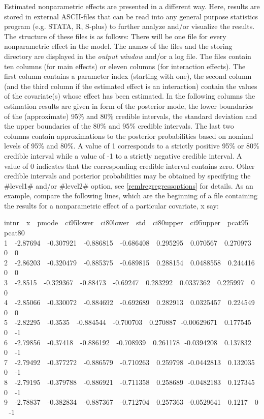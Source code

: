 Estimated nonparametric effects are presented in a different way.
Here, results are stored in external ASCII-files that can be read
into any general purpose statistics program (e.g. STATA, R, S-plus)
to further analyze and/or visualize the results. The structure of
these files is as follows: There will be one file for every
nonparametric effect in the model. The names of the files and the
storing directory are displayed in the {\em output window} and/or a
log file. The files contain ten columns (for main effects) or eleven
columns (for interaction effects). The first column contains a
parameter index (starting with one), the second column (and the
third column if the estimated effect is an interaction) contain the
values of the covariate(s) whose effect has been estimated. In the
following columns the estimation results are given in form of the
posterior mode, the lower boundaries of the (approximate) 95\% and
80\% credible intervals, the standard deviation and the upper
boundaries of the 80\% and 95\% credible intervals. The last two
columns contain approximations to the posterior probabilities based
on nominal levels of 95\% and 80\%. A value of 1 corresponds to a
strictly positive 95\% or 80\% credible interval while a value of -1
to a strictly negative credible interval. A value of 0 indicates
that the corresponding credible interval contains zero. Other
credible intervals and posterior probabilities may be obtained by
specifying the #level1# and/or #level2# option, see
\autoref{remlregregressoptions} for details. As an example, compare
the following lines, which are the beginning of a file containing
the results for a nonparametric effect of a particular covariate, x
say:

\footnotesize
 intnr \,\, x \,\, pmode \,\, ci95lower \,\, ci80lower \,\, std \,\, ci80upper \,\, ci95upper \,\, pcat95 \,\, pcat80\\
 1 \,\, -2.87694 \,\, -0.307921 \,\, -0.886815 \,\, -0.686408 \,\, 0.295295 \,\, 0.070567   \,\, 0.270973 \,\, 0 \,\, 0\\
 2 \,\, -2.86203 \,\, -0.320479 \,\, -0.885375 \,\, -0.689815 \,\, 0.288154 \,\, 0.0488558  \,\, 0.244416 \,\, 0 \,\, 0\\
 3 \,\, -2.8515  \,\, -0.329367 \,\, -0.88473  \,\, -0.69247  \,\, 0.283292 \,\, 0.0337362  \,\, 0.225997 \,\, 0 \,\, 0\\
 4 \,\, -2.85066 \,\, -0.330072 \,\, -0.884692 \,\, -0.692689 \,\, 0.282913 \,\, 0.0325457  \,\, 0.224549 \,\, 0 \,\, 0\\
 5 \,\, -2.82295 \,\, -0.3535   \,\, -0.884544 \,\, -0.700703 \,\, 0.270887 \,\,-0.00629671 \,\, 0.177545 \,\, 0 \,\, -1\\
 6 \,\, -2.79856 \,\, -0.37418  \,\, -0.886192 \,\, -0.708939 \,\, 0.261178 \,\,-0.0394208  \,\, 0.137832 \,\, 0 \,\, -1\\
 7 \,\, -2.79492 \,\, -0.377272 \,\, -0.886579 \,\, -0.710263 \,\, 0.259798 \,\,-0.0442813  \,\, 0.132035 \,\, 0 \,\, -1\\
 8 \,\, -2.79195 \,\, -0.379788 \,\, -0.886921 \,\, -0.711358 \,\, 0.258689 \,\,-0.0482183  \,\, 0.127345 \,\, 0 \,\, -1\\
 9 \,\, -2.78837 \,\, -0.382834 \,\, -0.887367 \,\, -0.712704 \,\, 0.257363 \,\,-0.0529641  \,\, 0.1217   \,\, 0 \,\, -1
\normalsize

